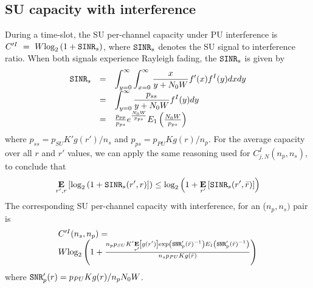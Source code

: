 \subsection{SU capacity with interference}
During a time-slot, the SU per-channel capacity under PU interference is $C'^{I}~=~W\text{log}_{2}\left(1+\text{\ttfamily{SINR}}_{s}\right)$, where $\text{\ttfamily{SINR}}_{s}$ denotes the SU signal to interference ratio. 
When both signals experience Rayleigh fading, the $\text{\ttfamily{SINR}}_{s}$ is given by
\begin{equation}\label{SINRs}
\begin{array}{lcl}
\text{\ttfamily{SINR}}_{s} & = & \displaystyle\int_{y=0}^{\infty}\displaystyle\int_{x=0}^{\infty}
\displaystyle\frac{x}{y+N_{0}W}f'(x)f^{I}(y)dxdy \\
& = & \displaystyle\int_{y=0}^{\infty}\displaystyle\frac{p_{ss}}{y + N_{0}W}f^{I}(y)dy \\
& = & \frac{p_{pp}}{p_{ps}}e^{\frac{N_{0}W}{p_{ps}}}E_{1}\left(\frac{N_{0}W}{p_{ps}}\right)
\end{array}
\end{equation}
where $p_{ss}= p_{SU}K'g(r')/n_{s}$ and $p_{ps}=p_{PU}Kg(r)/n_{p}$. For the average capacity over all $r$ and $r'$ values, we can apply the same reasoning used for $C^{I}_{j,N}(n_{p},n_{s})$, to conclude that
\begin{equation}
\underset{r',r}{\mathbf{E}}\left[\text{log}_{2}\left(1+\text{\ttfamily{SINR}}_{s}(r',r)\right]\right) \leq \\
\text{log}_{2}\left(1+\underset{r'}{\mathbf{E}}\left[\text{\ttfamily{SINR}}_{s}(r',\bar{r})\right]\right)
\end{equation}
The corresponding SU per-channel capacity with interference, for an ($n_{p},n_{s})$ pair is
\begin{equation}\label{CISU}
\begin{array}{l}
C'^{I}(n_{s},n_{p}) = \\
W\text{log}_{2}\left(1+
\frac{n_{p}p_{SU}K'\underset{r'}{\mathbf{E}}\left[g(r')\right]\text{exp}\left(\text{\ttfamily{SNR}}'_{p}(\bar{r})^{-1}\right)E_{1}\left(\text{\ttfamily{SNR}}'_{p}(\bar{r})^{-1}\right)}
{n_{s}p_{PU}Kg(\bar{r})}\right)
\end{array}
\end{equation}
where $\text{\ttfamily{SNR}}'_{p}(r)=p_{PU}Kg(r)/n_{p}N_{0}W$.

